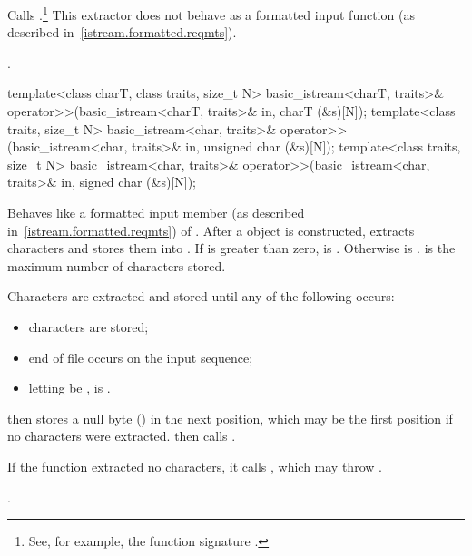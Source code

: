 \begin{itemdescr}
\pnum
\effects
Calls
.\footnote{See, for example, the function signature
.}
This extractor does not behave as a formatted input function
(as described in~\ref{istream.formatted.reqmts}).

\pnum
\returns
{}.
\end{itemdescr}

%
\begin{itemdecl}
template<class charT, class traits, size_t N>
  basic_istream<charT, traits>& operator>>(basic_istream<charT, traits>& in, charT (&s)[N]);
template<class traits, size_t N>
  basic_istream<char, traits>& operator>>(basic_istream<char, traits>& in, unsigned char (&s)[N]);
template<class traits, size_t N>
  basic_istream<char, traits>& operator>>(basic_istream<char, traits>& in, signed char (&s)[N]);
\end{itemdecl}

\begin{itemdescr}
\pnum
\effects
Behaves like a formatted input member (as described in~\ref{istream.formatted.reqmts})
of .
After a
object is constructed,
extracts characters and stores them into
.
If
is greater than zero,  is
.
Otherwise  is .
 is the maximum number of characters stored.

\pnum
Characters are extracted and stored until any of the following occurs:
\begin{itemize}
\item {} characters are stored;
\item end of file occurs on the input sequence;
\item letting  be ,
 is .
\end{itemize}

\pnum
{}
then stores a null byte
()
in the next position, which may be the first position if no characters
were extracted.
then calls
.

\pnum
If the function extracted no characters, it calls
,
which may throw
.

\pnum
\returns
{}.
\end{itemdescr}

